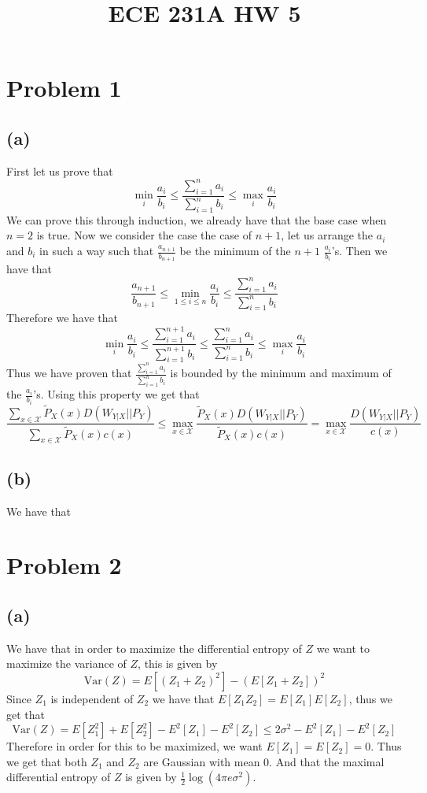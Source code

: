 
\title{ECE 231A HW 5}

\maketitle
\section*{Problem 1}
\subsection*{(a)}
First let us prove that 
$$\min_{i}\frac{a_i}{b_i}\leq\frac{\sum_{i=1}^{n}a_i}{\sum_{i=1}^{n}b_i}\leq\max_{i}\frac{a_i}{b_i}$$
We can prove this through induction, we already have that 
the base case when $n=2$ is true. Now
we consider the case the case of $n+1$, let us 
arrange the $a_i$ and $b_i$ in such a way such that 
$\frac{a_{n+1}}{b_{n+1}}$ be the minimum of the $n+1$ $\frac{a_{i}}{b_{i}}$'s. 
Then we have that  
$$\frac{a_{n+1}}{b_{n+1}} \leq \min_{1\leq i\leq n}\frac{a_i}{b_i}
\leq \frac{\sum_{i=1}^{n}a_i}{\sum_{i=1}^{n}b_i}$$
Therefore we have that 
$$\min_{i}\frac{a_i}{b_i}\leq\frac{\sum_{i=1}^{n+1}a_i}{\sum_{i=1}^{n+1}b_i}
\leq\frac{\sum_{i=1}^{n}a_i}{\sum_{i=1}^{n}b_i}\leq \max_{i}\frac{a_i}{b_i}$$
Thus we have proven that $\frac{\sum_{i=1}^{n}a_i}{\sum_{i=1}^{n}b_i}$ 
is bounded by the minimum and maximum of the $\frac{a_i}{b_i}$'s. Using this property we get
that 
$$\frac{\sum_{x\in \mathcal{X}}\tilde{P}_X(x)D(W_{Y|X}||P_Y)}
{\sum_{x\in \mathcal{X}}\tilde{P}_X(x)c(x)}\leq 
\max_{x\in \mathcal{X}} \frac{\tilde{P}_X(x)D(W_{Y|X}||P_Y)}{\tilde{P}_X(x)c(x)}=\max_{x\in \mathcal{X}} \frac{D(W_{Y|X}||P_Y)}{c(x)}$$
\subsection*{(b)}
We have that 

\section*{Problem 2}
\subsection*{(a)}
We have that in order to maximize the 
differential entropy of $Z$ we want to maximize
the variance of $Z$, this is given by 
$$\text{Var}(Z)=E[(Z_1+Z_2)^2]-(E[Z_1+Z_2])^2$$
Since $Z_1$ is independent of $Z_2$ we have that
$E[Z_1Z_2]=E[Z_1]E[Z_2]$, thus we get that 
$$\text{Var}(Z)=E[Z_1^2]+E[Z_2^2]-E^2[Z_1]-E^2[Z_2]\leq 2\sigma^2 -E^2[Z_1]-E^2[Z_2]$$
Therefore in order for this to be maximized, we want $E[Z_1]=E[Z_2]=0$. 
Thus we get that both $Z_1$ and $Z_2$ are Gaussian with mean 0. And that 
the maximal differential entropy of $Z$ is given by $\frac{1}{2}\log(4\pi e\sigma^2)$.
